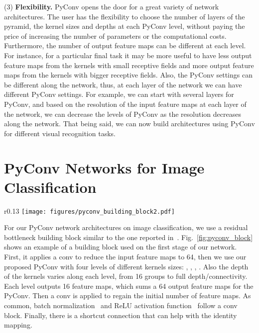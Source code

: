 \documentclass{article}
\begin{document}
(3) {\bf Flexibility.} PyConv opens the door for a great variety of network architectures. The user has the flexibility to choose the number of layers of the pyramid, the kernel sizes and depths at each PyConv level, without paying the price of increasing the number of parameters or the computational costs. Furthermore, the number of output feature maps can be different at each level.  For instance, for a particular final task it may be more useful to have less output feature maps from the kernels with small receptive fields and more output feature maps from the kernels with bigger receptive fields. Also, the PyConv settings can be different along the network, thus, at each layer of the network we can have different PyConv settings. For example, we can start with several layers for PyConv, and  based on the resolution of the input feature maps at each layer of the network, we can decrease the levels of PyConv as the resolution decreases along the network. That being said, we can now build architectures using PyConv for different visual recognition tasks.

\section{PyConv Networks for Image Classification \label{sec:pyconvresnet}}

\begin{wrapfigure}{r}{0.13\textwidth}
\vspace{-0.4in}
  \centering
    \texttt{[image: figures/pyconv\_building\_block2.pdf]}
  \caption{PyConv bottleneck building block.\label{fig:pyconv_block}}
  \vspace{-0.2in}
\end{wrapfigure}

For our PyConv network architectures on image classification, we use a residual bottleneck building block similar to the one reported  in~\cite{he2016deep}. Fig.~\ref{fig:pyconv_block} shows an example of a building block used on the first stage of our network. First, it applies a  conv to reduce the input feature maps to 64, then we use our proposed PyConv with four levels of different kernels sizes: , , , . Also the depth of the kernels varies along each level, from 16 groups to full depth/connectivity. Each level outputs 16 feature maps, which sums a 64  output feature maps for the PyConv. Then a  conv is applied to regain the initial number of feature maps. As common, batch normalization~\cite{ioffe2015batch} and ReLU activation function~\cite{nair2010rectified} follow a conv block. Finally, there is a shortcut connection that can help with the identity mapping.
\end{document}

